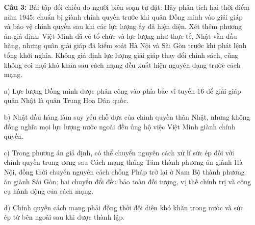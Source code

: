 \documentclass[12pt,a4paper]{article}
\begin{document}
\par\noindent\begin{minipage}{\linewidth}
\noindent\textbf{Câu 3:} Bài tập đối chiếu do người biên soạn tự đặt: Hãy phân tích hai thời điểm năm 1945: chuẩn bị giành chính quyền trước khi quân Đồng minh vào giải giáp và bảo vệ chính quyền sau khi các lực lượng ấy đã hiện diện. Xét thêm phương án giả định: Việt Minh đã có tổ chức và lực lượng như thực tế, Nhật vẫn đầu hàng, nhưng quân giải giáp đã kiểm soát Hà Nội và Sài Gòn trước khi phát lệnh tổng khởi nghĩa. Không giả định lực lượng giải giáp thay đổi chính sách, cũng không coi mọi khó khăn sau cách mạng đều xuất hiện nguyên dạng trước cách mạng.\par
\noindent a) Lực lượng Đồng minh được phân công vào phía bắc vĩ tuyến 16 để giải giáp quân Nhật là quân Trung Hoa Dân quốc.\par
\noindent b) Nhật đầu hàng làm suy yếu chỗ dựa của chính quyền thân Nhật, nhưng không đồng nghĩa mọi lực lượng nước ngoài đều ủng hộ việc Việt Minh giành chính quyền.\par
\noindent c) Trong phương án giả định, có thể chuyển nguyên cách xử lí sức ép đối với chính quyền trung ương sau Cách mạng tháng Tám thành phương án giành Hà Nội, đồng thời chuyển nguyên cách chống Pháp trở lại ở Nam Bộ thành phương án giành Sài Gòn; hai chuyển đổi đều bảo toàn đối tượng, vị thế chính trị và công cụ hành động của cách mạng.\par
\noindent d) Chính quyền cách mạng phải đồng thời đối diện khó khăn trong nước và sức ép từ bên ngoài sau khi được thành lập.\par
\end{minipage}\par\vspace{0.12cm}
\end{document}
